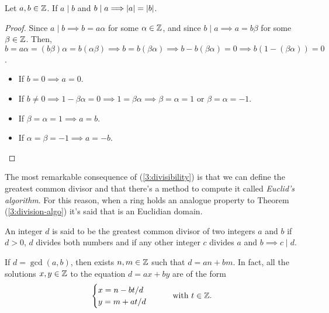 \begin{prop}
    Let $a, b\in\mathbb{Z}$. If $a\mid b$ and $b\mid a\Longrightarrow\left\vert a \right\vert = \left\vert b \right\vert$.
\end{prop}

\begin{proof}
    Since $a\mid b\implies b = a\alpha$ for some $\alpha\in\mathbb{Z}$, and since $b\mid a\implies a = b\beta$
    for some $\beta\in\mathbb{Z}$. Then, $b = a\alpha = \left( b\beta \right) \alpha = b\left(\alpha\beta\right)
    \implies b = b\left( \beta\alpha \right)\implies b - b\left( \beta\alpha \right) = 0\implies b\left(
    1 - \left( \beta\alpha \right) \right) = 0$.
    \begin{itemize}[itemsep = -2pt]
        \item If $b = 0\implies a = 0$.
        \item If $b\neq 0\implies 1 - \beta\alpha = 0\implies 1 = \beta\alpha\implies \beta = \alpha = 1$
            or $\beta = \alpha = -1$.
        \item If $\beta = \alpha = 1\implies a = b$.
        \item If $\alpha = \beta = -1\implies a = -b$.
    \end{itemize}
\end{proof}

The most remarkable consequence of (\ref{3:divisibility}) is that we can define the greatest common divisor
and that there's a method to compute it called \textit{Euclid's algorithm}. For this reason, when a ring holds
an analogue property to Theorem (\ref{3:division-algo}) it's said that is an Euclidian domain.

\begin{defi}
    An integer $d$ is said to be the greatest common divisor of two
    integers $a$ and $b$ if $d > 0$, $d$ divides both numbers and if any other integer $c$ divides $a$
    and $b\implies c\mid d$.
\end{defi}

\begin{prop} \label{bezout-id}
    If $d = \gcd\left( a, b \right) $, then exists $n, m\in\mathbb{Z}$ such that $d = an + bm$. In fact, all the solutions $x, y\in\mathbb{Z}$ to the equation $d = ax + by$ are of the form
    \begin{equation}
        \begin{cases}
            x = n - bt/d \\
            y = m + at/d
        \end{cases}
        \quad\quad\textrm{with } t\in\mathbb{Z}.
    \end{equation}
\end{prop}

